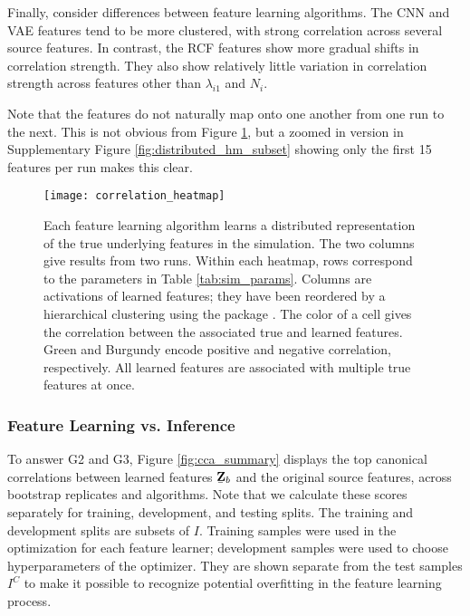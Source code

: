Finally, consider differences between feature learning algorithms. The CNN and
VAE features tend to be more clustered, with strong correlation across several
source features. In contrast, the RCF features show more gradual shifts in
correlation strength. They also show relatively little variation in correlation
strength across features other than $\lambda_{i1}$ and $N_{i}$.

Note that the features do not naturally map onto one another from one run to the
next. This is not obvious from Figure \ref{fig:distributed_hm}, but a zoomed in
version in Supplementary Figure \ref{fig:distributed_hm_subset} showing only the
first 15 features per run makes this clear.

\begin{figure}
  \centering
  \texttt{[image: correlation\_heatmap]}
  \caption{Each feature learning algorithm learns a distributed
    representation of the true underlying features in the simulation. The two
    columns give results from two runs. Within each heatmap, rows correspond to
    the parameters in Table \ref{tab:sim_params}. Columns are activations of
    learned features; they have been reordered by a hierarchical clustering
    using the package \citep{barter2018superheat}. The color of a cell gives the
    correlation between the associated true and learned features. Green and
    Burgundy encode positive and negative correlation, respectively. All learned
    features are associated with multiple true features at once.}
  \label{fig:distributed_hm}
\end{figure}

\subsubsection{Feature Learning vs. Inference}

To answer G2 and G3, Figure \ref{fig:cca_summary} displays the top canonical
correlations between learned features $\underaccent{\bar}{\mathbf{Z}}_{b}$ and
the original source features, across bootstrap replicates and algorithms. Note
that we calculate these scores separately for training, development, and testing
splits. The training and development splits are subsets of $I$. Training samples
were used in the optimization for each feature learner; development samples were
used to choose hyperparameters of the optimizer. They are shown separate from
the test samples $I^{C}$ to make it possible to recognize potential overfitting
in the feature learning process.

